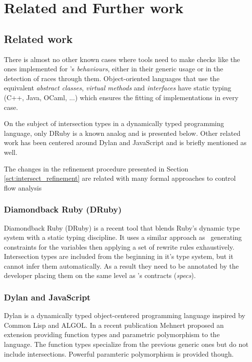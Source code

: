 \chapter{Related and Further work}

\section{Related work}
\label{sct:related_work}

There is almost no other known cases where tools need to make checks
like the ones implemented for \er's \emph{behaviours}, either in their
generic usage or in the detection of races through
them. Object-oriented languages that use the equivalent \emph{abstract
  classes}, \emph{virtual methods} and \emph{interfaces} have static
typing (C++, Java, OCaml, ...) which ensures the fitting of
implementations in every case.

On the subject of intersection types in a dynamically typed
programming language, only DRuby is a known analog and is presented
below. Other related work has been centered around Dylan and
JavaScript and is briefly mentioned as well.

The changes in the refinement procedure presented in Section
\ref{sct:intersect_refinement} are related with many formal approaches
to control flow analysis

\subsection{Diamondback Ruby (DRuby)}

Diamondback Ruby (DRuby)\cite{druby} is a recent tool that blends
Ruby's dynamic type system with a static typing discipline. It uses a
similar approach as \dr\ generating constraints for the variables then
applying a set of rewrite rules exhaustively. Intersection types are
included from the beginning in it's type system, but it cannot infer
them automatically. As a result they need to be annotated by the
developer placing them on the same level as \dr's contracts
(\emph{specs}).

\subsection{Dylan and JavaScript}

Dylan is a dynamically typed object-centered programming language
inspired by Common Lisp and ALGOL. In a recent publication Mehnert
proposed an extension providing function types and parametric
polymorphism to the language\cite{dylan}. The function types
specialize from the previous generic ones but do not include
intersections. Powerful paramteric polymorphism is provided though.

